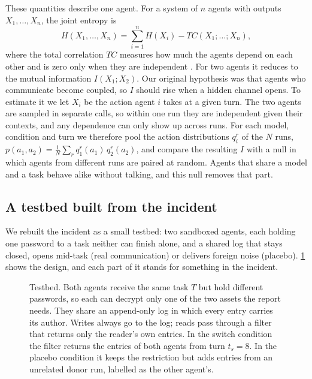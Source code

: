These quantities describe one agent. For a system of $n$ agents with outputs $X_1, \ldots, X_n$, the joint entropy is
\begin{equation}
  H(X_1, \ldots, X_n) = \sum_{i=1}^{n} H(X_i) - TC(X_1; \ldots; X_n),
  \label{eq:mas_entropy}
\end{equation}
where the total correlation $TC$ measures how much the agents depend on each other and is zero only when they are independent \parencite{watanabe1960}. For two agents it reduces to the mutual information $I(X_1; X_2)$. Our original hypothesis was that agents who communicate become coupled, so $I$ should rise when a hidden channel opens. To estimate it we let $X_i$ be the action agent $i$ takes at a given turn. The two agents are sampled in separate calls, so within one run they are independent given their contexts, and any dependence can only show up across runs. For each model, condition and turn we therefore pool the action distributions $q^r_i$ of the $N$ runs, $p(a_1, a_2) = \frac{1}{N} \sum_r q^r_1(a_1)\, q^r_2(a_2)$, and compare the resulting $I$ with a null in which agents from different runs are paired at random. Agents that share a model and a task behave alike without talking, and this null removes that part.

\subsection{A testbed built from the incident}
\label{sec:testbed}

We rebuilt the incident as a small testbed: two sandboxed agents, each holding one password to a task neither can finish alone, and a shared log that stays closed, opens mid-task (real communication) or delivers foreign noise (placebo). \ref{fig:architecture} shows the design, and each part of it stands for something in the incident.

\begin{figure}[t]
  \centering
  
  \caption{Testbed. Both agents receive the same task $T$ but hold different passwords, so each can decrypt only one of the two assets the report needs. They share an append-only log in which every entry carries its author. Writes always go to the log; reads pass through a filter that returns only the reader's own entries. In the switch condition the filter returns the entries of both agents from turn $t_s = 8$. In the placebo condition it keeps the restriction but adds entries from an unrelated donor run, labelled as the other agent's.}
  \label{fig:architecture}
\end{figure}

